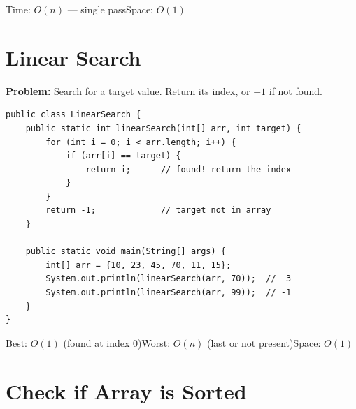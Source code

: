 \documentclass[12pt,a4paper,oneside]{book}
\begin{document}
\begin{complexity}
Time: $O(n)$ --- single pass\quad Space: $O(1)$
\end{complexity}

\section{Linear Search}

\textbf{Problem:} Search for a target value. Return its index, or $-1$ if not found.

\begin{lstlisting}[caption={Linear Search --- scan left to right}]
public class LinearSearch {
    public static int linearSearch(int[] arr, int target) {
        for (int i = 0; i < arr.length; i++) {
            if (arr[i] == target) {
                return i;      // found! return the index
            }
        }
        return -1;             // target not in array
    }

    public static void main(String[] args) {
        int[] arr = {10, 23, 45, 70, 11, 15};
        System.out.println(linearSearch(arr, 70));  //  3
        System.out.println(linearSearch(arr, 99));  // -1
    }
}
\end{lstlisting}

\begin{center}
\end{center}

\begin{complexity}
Best: $O(1)$ (found at index 0)\quad Worst: $O(n)$ (last or not present)\quad Space: $O(1)$
\end{complexity}

\section{Check if Array is Sorted}
\end{document}
